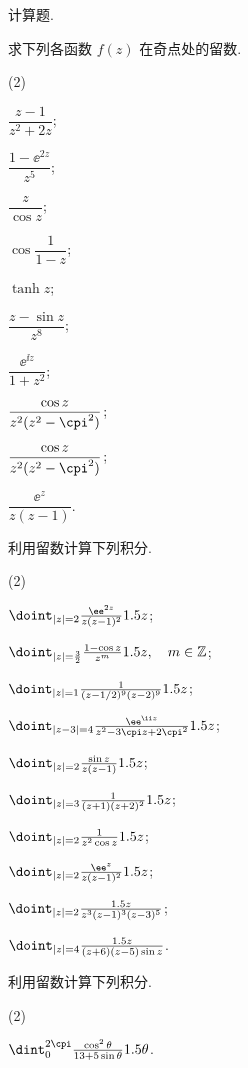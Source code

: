 \begin{homework}
  \item 计算题.
  \begin{homework}
    \item 求下列各函数 $f(z)$ 在奇点处的留数.
      \begin{subhomework}(2)
        \item $\dfrac{z-1}{z^2+2z}$;
        \item $\dfrac{1-\ee^{2z}}{z^5}$;
        \item $\dfrac z{\cos z}$;
        \item $\cos\dfrac1{1-z}$;
        \item $\tanh z$;
        \item $\dfrac{z-\sin z}{z^8}$;
        \item $\dfrac{\ee^{\ii z}}{1+z^2}$;
        \item $\dfrac{\cos z}{z^2(z^2-\cpi^2)}$;
        \item $\dfrac{\cos z}{z^2(z^2-\cpi^2)}$;
        \item $\dfrac{\ee^z}{z(z-1)}$.
      \end{subhomework}
    \item 利用留数计算下列积分.
      \begin{subhomework}(2)
        \item $\doint_{|z|=2}\frac{\ee^{2z}}{z(z-1)^2}\d z$;
        \item $\doint_{|z|=\frac32}\frac{1-\cos z}{z^m}\d z,\quad m\in\BZ$;
        \item $\doint_{|z|=1}\frac1{(z-1/2)^9(z-2)^9}\d z$;
        \item $\doint_{|z-3|=4}\frac{\ee^{\ii z}}{z^2-3\cpi z+2\cpi^2}\d z$;
        \item $\doint_{|z|=2}\frac{\sin z}{z(z-1)}\d z$;
        \item $\doint_{|z|=3}\frac{1}{(z+1)(z+2)^2}\d z$;
        \item $\doint_{|z|=2}\frac1{z^2\cos z}\d z$;
        \item $\doint_{|z|=2}\frac{\ee^z}{z(z-1)^2}\d z$;
        \item $\doint_{|z|=2}\frac{\d z}{z^3(z-1)^3(z-3)^5}$;
        \item $\doint_{|z|=4}\frac{\d z}{(z+6)(z-5)\sin z}$.
      \end{subhomework}
      \item 利用留数计算下列积分.
        \begin{subhomework}(2)
          \item $\dint_0^{2\cpi}\frac{\cos^2\theta}{13+5\sin\theta}\d \theta$.

\end{subhomework}
\end{homework}
\end{homework}

